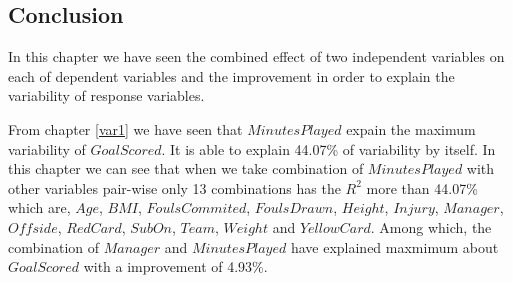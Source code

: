 \documentclass[12pt]{article}
\begin{document}
\newpage
\subsection{Conclusion}
In this chapter we have seen the combined effect of two independent variables on each of dependent variables and the improvement in order to explain the variability of response variables.

From chapter \ref{var1} we have seen that $ MinutesPlayed $ expain the maximum variability of $ GoalScored $. It is able to explain 44.07\% of variability by itself. In this chapter we can see that when we take combination of $ MinutesPlayed $ with other variables pair-wise only 13 combinations has the $ R^2 $ more than 44.07\% which are, $ Age $, $ BMI $, $ FoulsCommited $, $ FoulsDrawn $, $ Height $, $ Injury $, $ Manager $, $ Offside $, $ RedCard $, $ SubOn $, $ Team $, $ Weight $ and $ YellowCard $. Among which, the combination of $ Manager $ and $ MinutesPlayed $ have explained maxmimum about $ GoalScored $ with a improvement of 4.93\%. 





 
	
\end{document}
